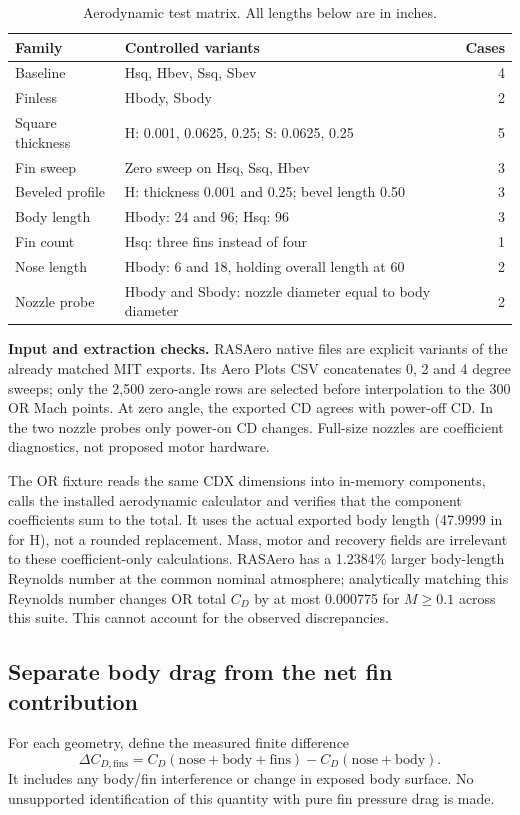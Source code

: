 \documentclass[oneside,openany]{amsdtx}
\begin{document}
\begin{table}[H]\centering\small\renewcommand{\arraystretch}{1.15}
\caption{Aerodynamic test matrix. All lengths below are in inches.}\label{tab:aeromatrix}
\begin{tabularx}{\textwidth}{@{}L{.26\textwidth}Xr@{}}\toprule
Family & Controlled variants & Cases\\\midrule
Baseline & Hsq, Hbev, Ssq, Sbev & 4\\
Finless & Hbody, Sbody & 2\\
Square thickness & H: 0.001, 0.0625, 0.25; S: 0.0625, 0.25 & 5\\
Fin sweep & Zero sweep on Hsq, Ssq, Hbev & 3\\
Beveled profile & H: thickness 0.001 and 0.25; bevel length 0.50 & 3\\
Body length & Hbody: 24 and 96; Hsq: 96 & 3\\
Fin count & Hsq: three fins instead of four & 1\\
Nose length & Hbody: 6 and 18, holding overall length at 60 & 2\\
Nozzle probe & Hbody and Sbody: nozzle diameter equal to body diameter & 2\\\bottomrule
\end{tabularx}\end{table}

\textbf{Input and extraction checks.} RASAero native files are explicit variants of the already matched MIT exports. Its Aero Plots CSV concatenates 0, 2 and 4 degree sweeps; only the 2,500 zero-angle rows are selected before interpolation to the 300 OR Mach points. At zero angle, the exported CD agrees with power-off CD. In the two nozzle probes only power-on CD changes. Full-size nozzles are coefficient diagnostics, not proposed motor hardware.

The OR fixture reads the same CDX dimensions into in-memory components, calls the installed aerodynamic calculator and verifies that the component coefficients sum to the total. It uses the actual exported body length (47.9999 in for H), not a rounded replacement. Mass, motor and recovery fields are irrelevant to these coefficient-only calculations. RASAero has a 1.2384\% larger body-length Reynolds number at the common nominal atmosphere; analytically matching this Reynolds number changes OR total $C_D$ by at most 0.000775 for $M\geq0.1$ across this suite. This cannot account for the observed discrepancies.



\clearpage\subsection{Separate body drag from the net fin contribution}
For each geometry, define the measured finite difference
\begin{equation}
\Delta C_{D,\mathrm{fins}}=C_D(\mathrm{nose+body+fins})-C_D(\mathrm{nose+body}).
\end{equation}
It includes any body/fin interference or change in exposed body surface. No unsupported identification of this quantity with pure fin pressure drag is made.
\end{document}
